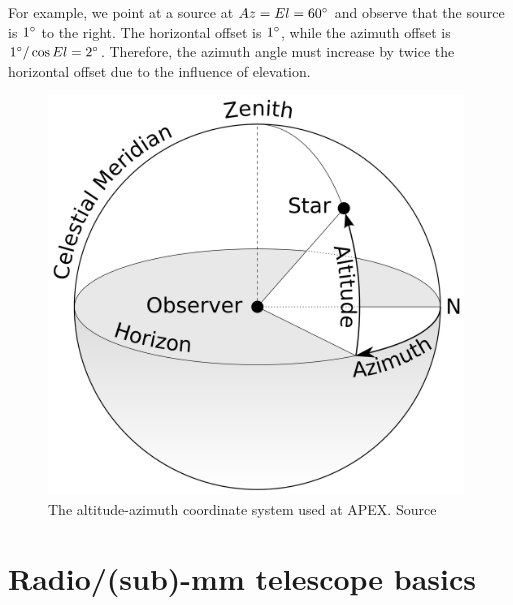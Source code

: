 For example, we point at a source at $ Az=El=60^\circ $ and observe that the source is $ 1^\circ $ to the right.
The horizontal offset is $1^\circ$, while the azimuth offset is $1^\circ/\cos{El}=2^\circ$.
Therefore, the azimuth angle must increase by twice the horizontal offset due to the influence of elevation.


\begin{figure}[H]
    \centering
    \includegraphics[width=0.98\textwidth]{Astronomy/Azimuth-Altitude_schematic.png}
    \caption{The altitude-azimuth coordinate system used at APEX. Source \cite{altaz_schematic}}
    \label{fig:altaz_coords}
\end{figure}




\section{Radio/(sub)-mm telescope basics}





